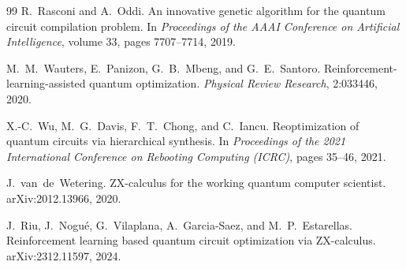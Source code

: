\documentclass[11pt]{article}
\begin{document}
\begin{thebibliography}{99}
R.~Rasconi and A.~Oddi.
\newblock An innovative genetic algorithm for the quantum circuit
compilation problem.
\newblock In \emph{Proceedings of the AAAI Conference on Artificial
Intelligence}, volume 33, pages 7707--7714, 2019.

M.~M.~Wauters, E.~Panizon, G.~B.~Mbeng, and G.~E.~Santoro.
\newblock Reinforcement-learning-assisted quantum optimization.
\newblock \emph{Physical Review Research}, 2:033446, 2020.

X.-C.~Wu, M.~G.~Davis, F.~T.~Chong, and C.~Iancu.
\newblock Reoptimization of quantum circuits via hierarchical synthesis.
\newblock In \emph{Proceedings of the 2021 International Conference on
Rebooting Computing (ICRC)}, pages 35--46, 2021.

J.~van~de~Wetering.
\newblock ZX-calculus for the working quantum computer scientist.
\newblock arXiv:2012.13966, 2020.

J.~Riu, J.~Nogué, G.~Vilaplana, A.~Garcia-Saez, and M.~P.~Estarellas.
\newblock Reinforcement learning based quantum circuit optimization via
ZX-calculus.
\newblock arXiv:2312.11597, 2024.

\end{thebibliography}
\end{document}
